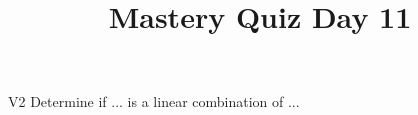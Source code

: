 \documentclass{sbgLAquiz}
\title{Mastery Quiz Day 11 }
\begin{document}
\begin{problem}{V2}
Determine if ... is a linear combination of ...
\end{problem}
\end{document}
